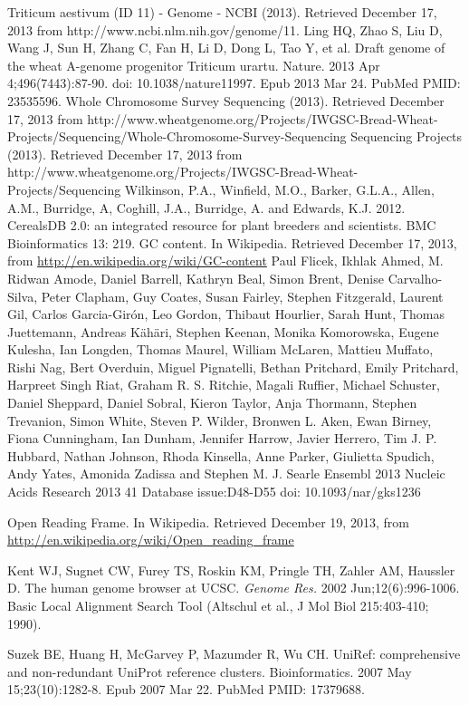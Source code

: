 \documentclass[10.9pt]{article} %
\begin{document}
%
%
\begin{thebibliography}{99}
{\small
{}
Triticum aestivum (ID 11) - Genome - NCBI (2013). Retrieved December 17, 2013 from http://www.ncbi.nlm.nih.gov/genome/11.
Ling HQ, Zhao S, Liu D, Wang J, Sun H, Zhang C, Fan H, Li D, Dong L, Tao Y, et al. Draft genome of the wheat A-genome progenitor Triticum
urartu. Nature. 2013 Apr 4;496(7443):87-90. doi: 10.1038/nature11997. Epub 2013 Mar 24. PubMed PMID: 23535596. 
Whole Chromosome Survey Sequencing (2013). Retrieved December 17, 2013 from http://www.wheatgenome.org/Projects/IWGSC-Bread-Wheat-
Projects/Sequencing/Whole-Chromosome-Survey-Sequencing
Sequencing Projects (2013). Retrieved December 17, 2013 from http://www.wheatgenome.org/Projects/IWGSC-Bread-Wheat-Projects/Sequencing
Wilkinson, P.A., Winfield, M.O., Barker, G.L.A., Allen, A.M., Burridge, A, Coghill, J.A., Burridge, A. and Edwards, K.J. 2012. CerealsDB 2.0:
an integrated resource for plant breeders and scientists. BMC Bioinformatics 13: 219.
  GC content. In Wikipedia. Retrieved December 17, 2013, from
  \url{http://en.wikipedia.org/wiki/GC-content}
Paul Flicek, Ikhlak Ahmed, M. Ridwan Amode, Daniel Barrell, Kathryn Beal, Simon Brent, Denise Carvalho-Silva, Peter Clapham, Guy Coates, Susan Fairley, Stephen Fitzgerald, Laurent Gil, Carlos Garcia-Girón, Leo Gordon, Thibaut Hourlier, Sarah Hunt, Thomas Juettemann, Andreas Kähäri, Stephen Keenan, Monika Komorowska, Eugene Kulesha, Ian Longden, Thomas Maurel, William McLaren, Mattieu Muffato, Rishi Nag, Bert Overduin, Miguel Pignatelli, Bethan Pritchard, Emily Pritchard, Harpreet Singh Riat, Graham R. S. Ritchie, Magali Ruffier, Michael Schuster, Daniel Sheppard, Daniel Sobral, Kieron Taylor, Anja Thormann, Stephen Trevanion, Simon White, Steven P. Wilder, Bronwen L. Aken, Ewan Birney, Fiona Cunningham, Ian Dunham, Jennifer Harrow, Javier Herrero, Tim J. P. Hubbard, Nathan Johnson, Rhoda Kinsella, Anne Parker, Giulietta Spudich, Andy Yates, Amonida Zadissa and Stephen M. J. Searle
Ensembl 2013
Nucleic Acids Research 2013 41 Database issue:D48-D55
doi: 10.1093/nar/gks1236

  Open Reading Frame. In Wikipedia. Retrieved December 19, 2013, from
  \url{http://en.wikipedia.org/wiki/Open_reading_frame}

    Kent WJ, Sugnet CW, Furey TS, Roskin KM, Pringle TH, Zahler AM, Haussler D. The human genome browser at UCSC. 
    \emph{Genome Res.} 2002 Jun;12(6):996-1006. 
  Basic Local Alignment Search Tool (Altschul et al., J Mol Biol 215:403-410; 1990).
}
Suzek BE, Huang H, McGarvey P, Mazumder R, Wu CH. UniRef: comprehensive and non-redundant UniProt reference clusters. Bioinformatics. 2007 May 15;23(10):1282-8. Epub 2007 Mar 22. PubMed PMID: 17379688. 
\end{thebibliography}
\end{document}
